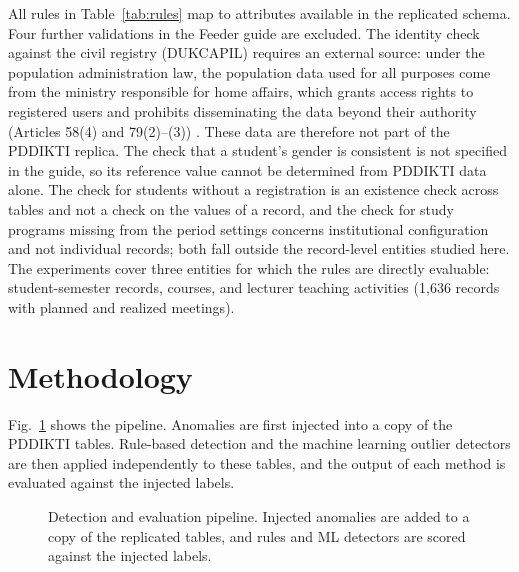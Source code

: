 \documentclass[conference]{IEEEtran}
\begin{document}
All rules in Table~\ref{tab:rules} map to attributes available in the replicated schema. Four further validations in the Feeder guide are excluded. The identity check against the civil registry (DUKCAPIL) requires an external source: under the population administration law, the population data used for all purposes come from the ministry responsible for home affairs, which grants access rights to registered users and prohibits disseminating the data beyond their authority (Articles 58(4) and 79(2)--(3)) \cite{uu24_2013}. These data are therefore not part of the PDDIKTI replica. The check that a student's gender is consistent is not specified in the guide, so its reference value cannot be determined from PDDIKTI data alone. The check for students without a registration is an existence check across tables and not a check on the values of a record, and the check for study programs missing from the period settings concerns institutional configuration and not individual records; both fall outside the record-level entities studied here. The experiments cover three entities for which the rules are directly evaluable: student-semester records, courses, and lecturer teaching activities (1{,}636 records with planned and realized meetings).


\section{Methodology}\label{sec:method}
Fig.~\ref{fig:pipeline} shows the pipeline. Anomalies are first injected into a copy of the PDDIKTI tables. Rule-based detection and the machine learning outlier detectors are then applied independently to these tables, and the output of each method is evaluated against the injected labels.

\begin{figure}[htbp]
\centering
{}
\caption{Detection and evaluation pipeline. Injected anomalies are added to a copy of the replicated tables, and rules and ML detectors are scored against the injected labels.}
\label{fig:pipeline}
\end{figure}
\end{document}
